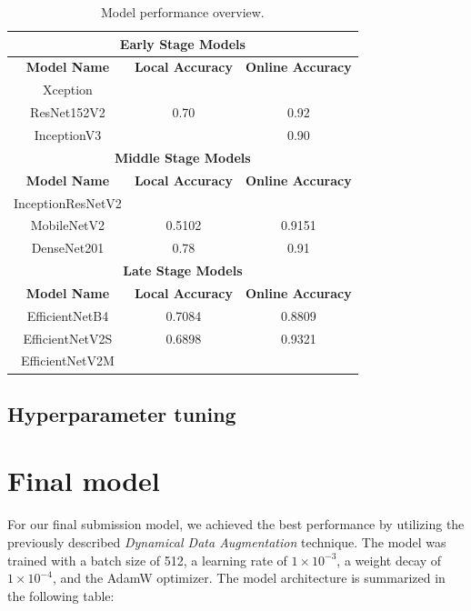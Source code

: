 \documentclass[11pt]{article}
\begin{document}
\begin{table}[h!]
    \centering
    \begin{tabular}{|c|c|c|}
        \hline
        \multicolumn{3}{|c|}{\textbf{Early Stage Models}} \\ \hline
        \textbf{Model Name} & \textbf{Local Accuracy} & \textbf{Online Accuracy} \\ \hline
        Xception            &  &  \\ \hline
        ResNet152V2         & 0.70 & 0.92 \\ \hline
        InceptionV3         &  & 0.90 \\ \hline
        \multicolumn{3}{|c|}{\textbf{Middle Stage Models}} \\ \hline
        \textbf{Model Name} & \textbf{Local Accuracy} & \textbf{Online Accuracy} \\ \hline
        InceptionResNetV2   &  &  \\ \hline
        MobileNetV2         & 0.5102 & 0.9151 \\ \hline
        DenseNet201         & 0.78 & 0.91 \\ \hline
        \multicolumn{3}{|c|}{\textbf{Late Stage Models}} \\ \hline
        \textbf{Model Name} & \textbf{Local Accuracy} & \textbf{Online Accuracy} \\ \hline
        EfficientNetB4      & 0.7084 & 0.8809 \\ \hline
        EfficientNetV2S     & 0.6898 & 0.9321 \\ \hline
        EfficientNetV2M     &  &  \\ \hline
    \end{tabular}
    \caption{Model performance overview.}
    \label{tab:models_performance}
\end{table}



\subsection{Hyperparameter tuning}


\section{Final model}
For our final submission model, we achieved the best performance by utilizing the previously described \textit{Dynamical Data Augmentation} technique. The model was trained with a batch size of 512, a learning rate of $1 \times 10^{-3}$, a weight decay of $1 \times 10^{-4}$, and the AdamW optimizer. The model architecture is summarized in the following table:
\end{document}
